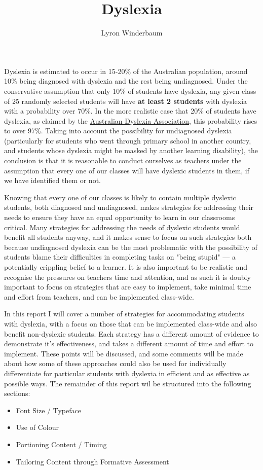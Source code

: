 \documentclass[17pt]{memoir}
\title{Dyslexia}
\author{Lyron Winderbaum}
\begin{document}
\maketitle



Dyslexia is estimated to occur in 15-20\% of the Australian population, around 10\% being diagnosed with dyslexia and the rest being undiagnosed. Under the conservative assumption that only 10\% of students have dyslexia, any given class of 25 randomly selected students will have \textbf{at least 2 students} with dyslexia with a probability over 70\%. In the more realistic case that 20\% of students have dyslexia, as claimed by the \href{https://dyslexiaassociation.org.au/dyslexia-in-australia/}{Australian Dyslexia Association}, this probability rises to over 97\%. Taking into account the possibility for undiagnosed dyslexia (particularly for students who went through primary school in another country, and students whose dyslexia might be masked by another learning disability), the conclusion is that it is reasonable to conduct ourselves as teachers under the assumption that every one of our classes will have dyslexic students in them, if we have identified them or not. 

Knowing that every one of our classes is likely to contain multiple dyslexic students, both diagnosed and undiagnosed, makes strategies for addressing their needs to ensure they have an equal opportunity to learn in our classrooms critical. Many strategies for addressing the needs of dyslexic students would benefit all students anyway, and it makes sense to focus on such strategies both because undiagnosed dyslexia can be the most problematic with the possibility of students blame their difficulties in completing tasks on "being stupid" --- a potentially crippling belief to a learner. It is also important to be realistic and recognise the pressures on teachers time and attention, and as such it is doubly important to focus on strategies that are easy to implement, take minimal time and effort from teachers, and can be implemented class-wide.

In this report I will cover a number of strategies for accommodating students with dyslexia, with a focus on those that can be implemented class-wide and also benefit non-dyslexic students. Each strategy has a different amount of evidence to demonstrate it's effectiveness, and takes a different amount of time and effort to implement. These points will be discussed, and some comments will be made about how some of these approaches could also be used for individually differentiate for particular students with dyslexia in efficient and as effective as possible ways. The remainder of this report wil be structured into the following sections:
\begin{itemize}
	\item Font Size / Typeface
	\item Use of Colour
	\item Portioning Content / Timing
	\item Tailoring Content through Formative Assessment
\end{itemize}
\end{document}
